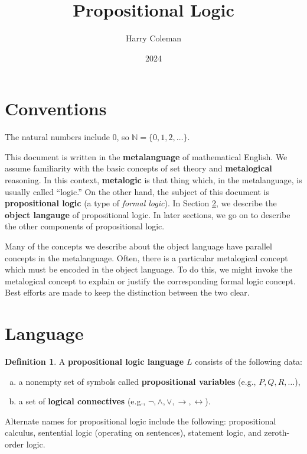 \documentclass[12pt]{article}
\renewcommand{\maketitle}{\thispagestyle{title}}
\theoremstyle{definition}
\newtheorem{definition}[theorem]{Definition}
\newcommand{\N}{\mathbb{N}}
\newcommand{\<}{\langle}
\renewcommand{\>}{\rangle}
\newcommand{\keyword}{\textbf}
\begin{document}
\title{Propositional Logic}
\author{Harry Coleman}
\date{2024}
\maketitle

\section[0]{Conventions}

The natural numbers include 0, so $\N = \{0, 1, 2, \dots\}$.

This document is written in the \keyword{metalanguage} of mathematical English.
We assume familiarity with the basic concepts of set theory and \keyword{metalogical} reasoning.
In this context, \keyword{metalogic} is that thing which, in the metalanguage, is usually called ``logic.''
On the other hand, the subject of this document is \keyword{propositional logic} (a type of \emph{formal logic}).
In Section \ref{sec:lang}, we describe the \keyword{object langauge} of propositional logic.
In later sections, we go on to describe the other components of propositional logic.

Many of the concepts we describe about the object language have parallel concepts in the metalanguage.
Often, there is a particular metalogical concept which must be encoded in the object language.
To do this, we might invoke the metalogical concept to explain or justify the corresponding formal logic concept.
Best efforts are made to keep the distinction between the two clear.

\section{Language}\label{sec:lang}

\begin{definition}\label{def:lang}
    A \keyword{propositional logic language} $L$ consists of the following data:
    \begin{enumerate}[(a)]
        \item a nonempty set of symbols called \keyword{propositional variables} (e.g., $P, Q, R, \dots$),
        \item a set of \keyword{logical connectives} (e.g., $\lnot, \land, \lor, \to, \leftrightarrow$).
    \end{enumerate}
    Alternate names for propositional logic include the following: propositional calculus, sentential logic (operating on sentences), statement logic, and zeroth-order logic.
\end{definition}
\end{document}
